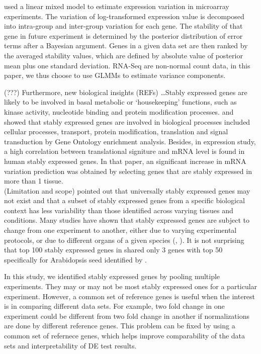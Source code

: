 \documentclass[11pt, a4paper]{article}
\begin{document}
\cite{andersen2004normalization} used a linear mixed model to estimate
expression variation in microarray experiments. The variation of
log-transformed expression value is decomposed into intra-group and
inter-group variation for each gene. The stability of that gene in future
experiment is determined by the posterior distribution of error terms after a
Bayesian argument. Genes in a given data set are then ranked by the averaged
stability values, which are defined by absolute value of posterior mean plus
one standard deviation.  RNA-Seq are non-normal count data, in this paper, we
thus choose to use GLMMs to estimate variance components.

(???) Furthermore, new biological insights (REFs) \dots Stably expressed genes
are likely to be involved in basal metabolic or ‘housekeeping’ functions, such
as  kinase activity, nucleotide binding and protein modification processes.
\cite{sekhon2011genome} and \cite{wang2010dynamic} showed that stably
expressed genes are involved in biological processes included cellular
processes, transport, protein modification, translation and signal
transduction by Gene Ontology enrichment analysis. Besides, in expression
study, a high correlation between translational signiture and mRNA level is
found in human stably expressed genes\citep{line2013translational}. In that
paper, an significant increase in mRNA variation prediction was obtained by
selecting genes that are stably expressed in more than 1 tissue.\\

(Limitation and scope) \cite{hruz2011refgenes} pointed out that universally
stably expressed genes may not exist and that a subset of stably expressed
genes from a specific biological context has less variability than those
identified across varying tissues and conditions. Many studies have shown that
stably expressed genes are subject to change from one experiment to another,
either due to varying experimental protocols, or due to different organs of a
given species (\cite{reid2006optimized}, \cite{hong2010identification}).  It
is not surprising that top 100 stably expressed genes in
\cite{czechowski2005genome} shared only 3 genes with top 50  specifically for
Arabidopsis seed identified by \cite{dekkers2012identification}.

In this study, we identified stably expressed genes by pooling multiple experiments. They may or may not be most stably expressed ones for a particular experiment. However, a common set of reference genes is useful when the interest is in comparing different data sets. For example, two fold change in one experiment could be different from two fold change in another if normalizations are done by different reference genes. This problem can be fixed by using a common set of refernece genes, which helps improve comparability of the data sets and interpretability of DE test results.  
\end{document}
